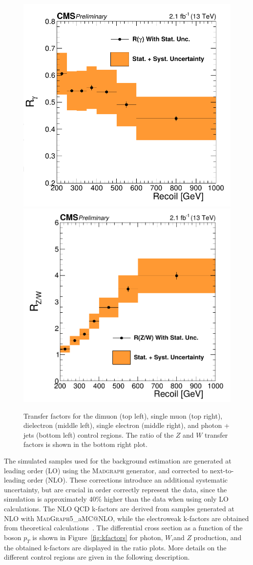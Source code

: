 \begin{figure}[ht]
 \vspace{.2cm}
 \includegraphics[width=.49\textwidth]{gamma_TF.png} 
 \includegraphics[width=.5\textwidth]{ZW_ratio.png} 
 \caption{Transfer factors for the dimuon (top left), single muon (top right), dielectron (middle left), single electron (middle right), and photon + jets (bottom left) control regions. The ratio of the $Z$ and $W$ transfer factors is shown in the bottom right plot.}
 \label{fig:TF}
\end{figure}

The simulated samples used for the background estimation are generated at leading order (LO) using the \textsc{Madgraph} generator, and corrected to next-to-leading order (NLO). These corrections introduce an additional systematic uncertainty, but are crucial in order correctly represent the data, since the simulation is approximately 40\% higher than the data when using only LO calculations. The NLO QCD k-factors are derived from samples generated at NLO with \textsc{MadGraph5\_}a\textsc{MC@NLO}, while the electroweak k-factors are obtained from theoretical calculations~\cite{Kuhn:2005gv, Kallweit:2015fta, Kallweit:2014xda, Kallweit:2015dum}. The differential cross section as a function of the boson $p_T$ is shown in Figure~\ref{fig:kfactors} for photon, $W$,and $Z$ production, and the obtained k-factors are displayed in the ratio plots. More details on the different control regions are given in the following description.

